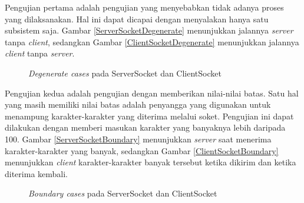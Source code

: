 Pengujian pertama adalah pengujian yang menyebabkan tidak adanya proses yang dilaksanakan.
Hal ini dapat dicapai dengan menyalakan hanya satu subsistem saja.
Gambar \ref{ServerSocketDegenerate} menunjukkan jalannya \textit{server} tanpa \textit{client},
sedangkan Gambar \ref{ClientSocketDegenerate} menunjukkan jalannya \textit{client} tanpa \textit{server}.

\begin{figure}
\centering
{}
\caption{\textit{Degenerate cases} pada ServerSocket dan ClientSocket}
\label{SocketDegenerate}
\end{figure}

Pengujian kedua adalah pengujian dengan memberikan nilai-nilai batas.
Satu hal yang masih memiliki nilai batas adalah penyangga yang digunakan untuk menampung karakter-karakter yang diterima melalui soket.
Pengujian ini dapat dilakukan dengan memberi masukan karakter yang banyaknya lebih daripada 100.
Gambar \ref{ServerSocketBoundary} menunjukkan \textit{server} saat menerima karakter-karakter yang banyak,
sedangkan Gambar \ref{ClientSocketBoundary} menunjukkan \textit{client} karakter-karakter banyak tersebut ketika dikirim dan ketika diterima kembali.

\begin{figure}
\centering
{}
\caption{\textit{Boundary cases} pada ServerSocket dan ClientSocket}
\label{SocketBoundary}
\end{figure}

